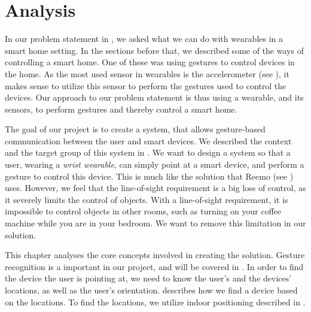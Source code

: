 \chapter{Analysis}\label{chap:analysis}

In our problem statement in , 
we asked what we can do with wearables in a smart home setting.
In the sections before that, 
we described some of the ways of controlling a smart home. 
One of these was using gestures to control devices in the home. 
As the most used sensor in wearables is the accelerometer (see ), 
it makes sense to utilize this sensor to perform the gestures used to control the devices. 
Our approach to our problem statement is thus using a wearable, 
and its sensors, to perform gestures and thereby control a smart home. 

The goal of our project is to create a system, 
that allows gesture-based communication between the user and smart devices.
We described the context and the target group of this system in .
We want to design a system so that a user, wearing a \emph{wrist wearable}, 
can simply point at a smart device, 
and perform a gesture to control this device. 
This is much like the solution that Reemo (see ) uses. 
However, we feel that the line-of-sight requirement is a big loss of control, 
as it severely limits the control of objects.
With a line-of-sight requirement, 
it is impossible to control objects in other rooms, 
such as turning on your coffee machine while you are in your bedroom. 
We want to remove this limitation in our solution. 

This chapter analyses the core concepts involved in creating the solution.
Gesture recognition is a important in our project, 
and will be covered in . 
In order to find the device the user is pointing at,
we need to know the user's and the devices' locations, 
as well as the user's orientation. 
 describes how we find a device based on the locations. 
To find the locations, we utilize indoor positioning described in .




